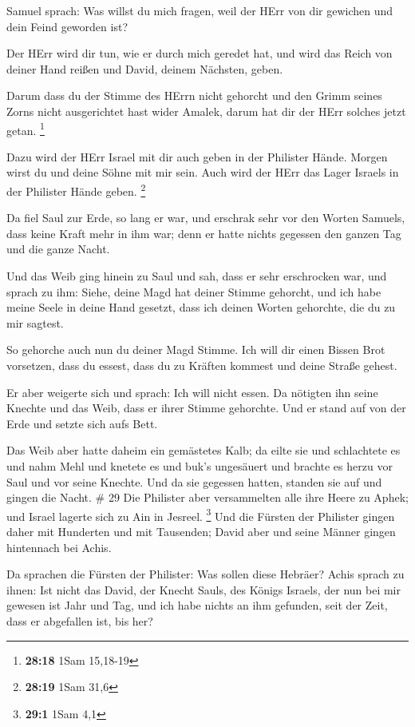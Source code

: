  Samuel sprach: Was willst du mich fragen, weil der HErr
von dir gewichen und dein Feind geworden ist?

 Der HErr wird dir tun, wie er durch mich geredet hat, und
wird das Reich von deiner Hand reißen und David, deinem Nächsten, geben.

 Darum dass du der Stimme des HErrn nicht gehorcht und den
Grimm seines Zorns nicht ausgerichtet hast wider Amalek, darum hat dir
der HErr solches jetzt getan. \footnote{\textbf{28:18} 1Sam 15,18-19}

 Dazu wird der HErr Israel mit dir auch geben in der
Philister Hände. Morgen wirst du und deine Söhne mit mir sein. Auch wird
der HErr das Lager Israels in der Philister Hände geben. \footnote{\textbf{28:19}
  1Sam 31,6}

 Da fiel Saul zur Erde, so lang er war, und erschrak sehr
vor den Worten Samuels, dass keine Kraft mehr in ihm war; denn er hatte
nichts gegessen den ganzen Tag und die ganze Nacht.

 Und das Weib ging hinein zu Saul und sah, dass er sehr
erschrocken war, und sprach zu ihm: Siehe, deine Magd hat deiner Stimme
gehorcht, und ich habe meine Seele in deine Hand gesetzt, dass ich
deinen Worten gehorchte, die du zu mir sagtest.

 So gehorche auch nun du deiner Magd Stimme. Ich will dir
einen Bissen Brot vorsetzen, dass du essest, dass du zu Kräften kommest
und deine Straße gehest.

 Er aber weigerte sich und sprach: Ich will nicht essen. Da
nötigten ihn seine Knechte und das Weib, dass er ihrer Stimme gehorchte.
Und er stand auf von der Erde und setzte sich aufs Bett.

 Das Weib aber hatte daheim ein gemästetes Kalb; da eilte
sie und schlachtete es und nahm Mehl und knetete es und buk's ungesäuert
 und brachte es herzu vor Saul und vor seine Knechte. Und
da sie gegessen hatten, standen sie auf und gingen die Nacht. \# 29
 Die Philister aber versammelten alle ihre Heere zu Aphek;
und Israel lagerte sich zu Ain in Jesreel. \footnote{\textbf{29:1} 1Sam
  4,1}  Und die Fürsten der Philister gingen daher mit
Hunderten und mit Tausenden; David aber und seine Männer gingen
hintennach bei Achis.

 Da sprachen die Fürsten der Philister: Was sollen diese
Hebräer? Achis sprach zu ihnen: Ist nicht das David, der Knecht Sauls,
des Königs Israels, der nun bei mir gewesen ist Jahr und Tag, und ich
habe nichts an ihm gefunden, seit der Zeit, dass er abgefallen ist, bis
her?

